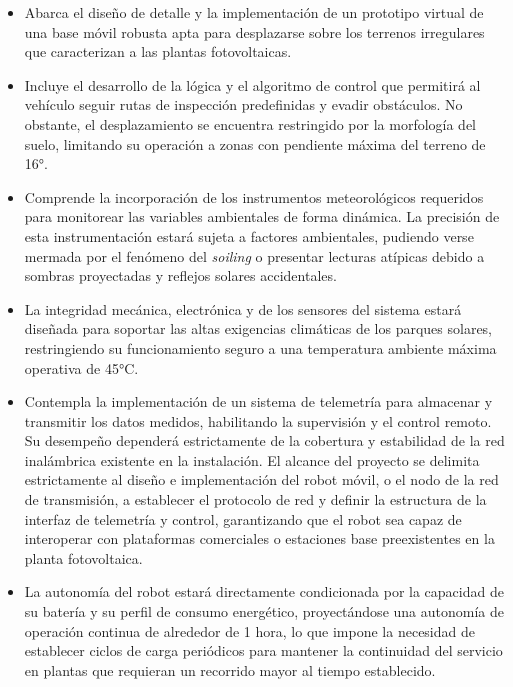\begin{itemize}
    \item Abarca el diseño de detalle y la implementación de un prototipo virtual de una base móvil robusta apta para desplazarse sobre los terrenos irregulares que caracterizan a las plantas fotovoltaicas.
 
    
    \item Incluye el desarrollo de la lógica y el algoritmo de control que permitirá al vehículo seguir rutas de inspección predefinidas y evadir obstáculos. No obstante, el desplazamiento se encuentra restringido por la morfología del suelo, limitando su operación a zonas con pendiente máxima del terreno de 16°.
    
    \item Comprende la incorporación de los instrumentos meteorológicos requeridos para monitorear las variables ambientales de forma dinámica. La precisión de esta instrumentación estará sujeta a factores ambientales, pudiendo verse mermada por el fenómeno del \textit{soiling} o presentar lecturas atípicas debido a sombras proyectadas y reflejos solares accidentales.
    
    \item La integridad mecánica, electrónica y de los sensores del sistema estará diseñada para soportar las altas exigencias climáticas de los parques solares, restringiendo su funcionamiento seguro a una temperatura ambiente máxima operativa de 45°C.
    
    \item Contempla la implementación de un sistema de telemetría para almacenar y transmitir los datos medidos, habilitando la supervisión y el control remoto. Su desempeño dependerá estrictamente de la cobertura y estabilidad de la red inalámbrica existente en la instalación. El alcance del proyecto se delimita estrictamente al diseño e implementación del robot móvil, o el nodo de la red de transmisión, a establecer el protocolo de red y definir la estructura de la interfaz de telemetría y control, garantizando que el robot sea capaz de interoperar con plataformas comerciales o estaciones base preexistentes en la planta fotovoltaica.
    
    \item La autonomía del robot estará directamente condicionada por la capacidad de su batería y su perfil de consumo energético, proyectándose una autonomía de operación continua de alrededor de 1 hora, lo que impone la necesidad de establecer ciclos de carga periódicos para mantener la continuidad del servicio en plantas que requieran un recorrido mayor al tiempo establecido.
\end{itemize}

